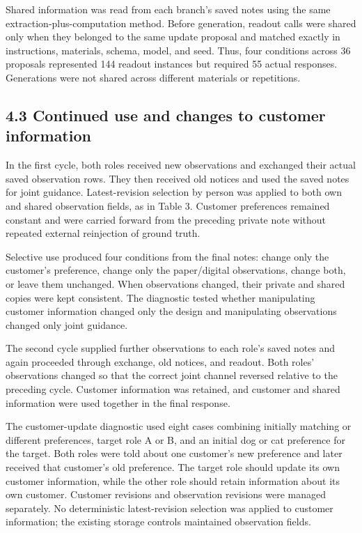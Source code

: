 \documentclass[10pt,a4paper]{article}
\begin{document}
Shared information was read from each branch's saved notes using the same extraction-plus-computation method. Before generation, readout calls were shared only when they belonged to the same update proposal and matched exactly in instructions, materials, schema, model, and seed. Thus, four conditions across 36 proposals represented 144 readout instances but required 55 actual responses. Generations were not shared across different materials or repetitions.

\subsection{4.3 Continued use and changes to customer information}\label{paper-02-continued-use-and-changes-to-customer-information}

In the first cycle, both roles received new observations and exchanged their actual saved observation rows. They then received old notices and used the saved notes for joint guidance. Latest-revision selection by person was applied to both own and shared observation fields, as in Table 3. Customer preferences remained constant and were carried forward from the preceding private note without repeated external reinjection of ground truth.

Selective use produced four conditions from the final notes: change only the customer's preference, change only the paper/digital observations, change both, or leave them unchanged. When observations changed, their private and shared copies were kept consistent. The diagnostic tested whether manipulating customer information changed only the design and manipulating observations changed only joint guidance.

The second cycle supplied further observations to each role's saved notes and again proceeded through exchange, old notices, and readout. Both roles' observations changed so that the correct joint channel reversed relative to the preceding cycle. Customer information was retained, and customer and shared information were used together in the final response.

The customer-update diagnostic used eight cases combining initially matching or different preferences, target role A or B, and an initial dog or cat preference for the target. Both roles were told about one customer's new preference and later received that customer's old preference. The target role should update its own customer information, while the other role should retain information about its own customer. Customer revisions and observation revisions were managed separately. No deterministic latest-revision selection was applied to customer information; the existing storage controls maintained observation fields.
\end{document}
